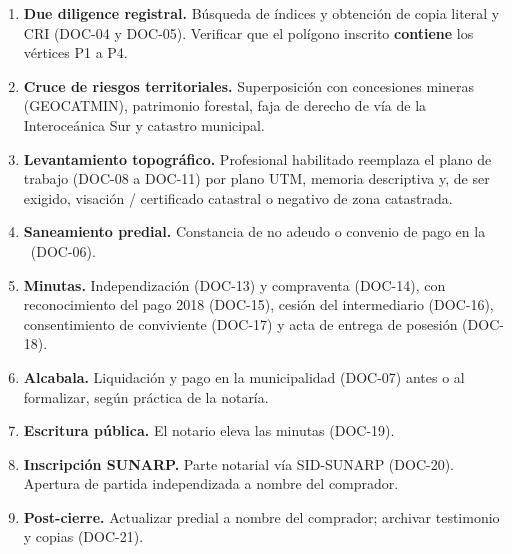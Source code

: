 \documentclass[12pt,a4paper]{article}
\begin{document}
\begin{enumerate}[leftmargin=1.15cm, itemsep=0.28em]
\item \textbf{Due diligence registral.} Búsqueda de índices y obtención de copia literal y CRI (DOC-04 y DOC-05). Verificar que el polígono inscrito \textbf{contiene} los vértices P1 a P4.
\item \textbf{Cruce de riesgos territoriales.} Superposición con concesiones mineras (GEOCATMIN), patrimonio forestal, faja de derecho de vía de la Interoceánica Sur y catastro municipal.
\item \textbf{Levantamiento topográfico.} Profesional habilitado reemplaza el plano de trabajo (DOC-08 a DOC-11) por plano UTM, memoria descriptiva y, de ser exigido, visación / certificado catastral o negativo de zona catastrada.
\item \textbf{Saneamiento predial.} Constancia de no adeudo o convenio de pago en la \Municipalidad\ (DOC-06).
\item \textbf{Minutas.} Independización (DOC-13) y compraventa (DOC-14), con reconocimiento del pago 2018 (DOC-15), cesión del intermediario (DOC-16), consentimiento de conviviente (DOC-17) y acta de entrega de posesión (DOC-18).
\item \textbf{Alcabala.} Liquidación y pago en la municipalidad (DOC-07) antes o al formalizar, según práctica de la notaría.
\item \textbf{Escritura pública.} El notario eleva las minutas (DOC-19).
\item \textbf{Inscripción SUNARP.} Parte notarial vía SID-SUNARP (DOC-20). Apertura de partida independizada a nombre del comprador.
\item \textbf{Post-cierre.} Actualizar predial a nombre del comprador; archivar testimonio y copias (DOC-21).
\end{enumerate}
\end{document}
